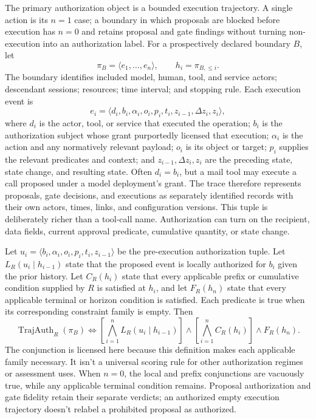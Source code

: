 The primary authorization object is a bounded execution trajectory. A single action is its \(n=1\) case; a boundary in which proposals are blocked before execution has \(n=0\) and retains proposal and gate findings without turning non-execution into an authorization label. For a prospectively declared boundary \(B\), let
\[
  \pi_B=\langle e_1,\ldots,e_n\rangle,
  \qquad h_i=\pi_{B,\leq i}.
\]
The boundary identifies included model, human, tool, and service actors; descendant sessions; resources; time interval; and stopping rule. Each execution event is
\[
 e_i=\langle d_i,b_i,\alpha_i,o_i,p_i,t_i,z_{i-1},\Delta z_i,z_i\rangle ,
\]
where \(d_i\) is the actor, tool, or service that executed the operation; \(b_i\) is the authorization subject whose grant purportedly licensed that execution; \(\alpha_i\) is the action and any normatively relevant payload; \(o_i\) is its object or target; \(p_i\) supplies the relevant predicates and context; and \(z_{i-1},\Delta z_i,z_i\) are the preceding state, state change, and resulting state. Often \(d_i=b_i\), but a mail tool may execute a call proposed under a model deployment's grant. The trace therefore represents proposals, gate decisions, and executions as separately identified records with their own actors, times, links, and configuration versions. This tuple is deliberately richer than a tool-call name. Authorization can turn on the recipient, data fields, current approval predicate, cumulative quantity, or state change.

Let \(u_i=\langle b_i,\alpha_i,o_i,p_i,t_i,z_{i-1}\rangle\) be the pre-execution authorization tuple. Let \(L_R(u_i\mid h_{i-1})\) state that the proposed event is locally authorized for \(b_i\) given the prior history. Let \(C_R(h_i)\) state that every applicable prefix or cumulative condition supplied by \(R\) is satisfied at \(h_i\), and let \(F_R(h_n)\) state that every applicable terminal or horizon condition is satisfied. Each predicate is true when its corresponding constraint family is empty. Then
\[
  \operatorname{TrajAuth}_R(\pi_B)
  \Longleftrightarrow
  \left[\bigwedge_{i=1}^{n}L_R(u_i\mid h_{i-1})\right]
  \land
  \left[\bigwedge_{i=1}^{n}C_R(h_i)\right]
  \land F_R(h_n).
\]
The conjunction is licensed here because this definition makes each applicable family necessary. It isn't a universal scoring rule for other authorization regimes or assessment uses.
When \(n=0\), the local and prefix conjunctions are vacuously true, while any applicable terminal condition remains. Proposal authorization and gate fidelity retain their separate verdicts; an authorized empty execution trajectory doesn't relabel a prohibited proposal as authorized.

